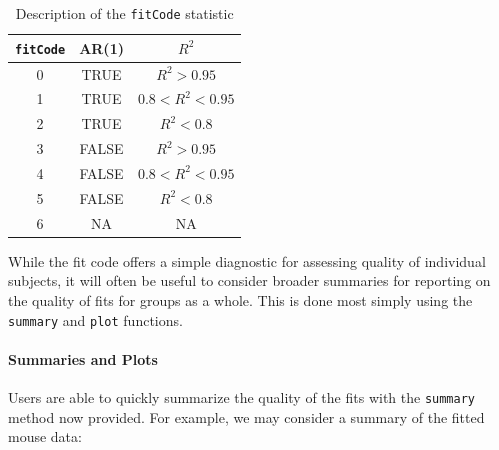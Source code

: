\documentclass{article}
\newcommand{\xt}{\texttt}%
\begin{document}
\begin{singlespace}
\begin{table}[H]
\centering
\def\arraystretch{1.5}
\begin{tabular}{|c|c|c|}
\hline
\xt{fitCode} & AR(1) & $R^2$ \\
\hline
0 & TRUE & $R^2 > 0.95$ \\
1 & TRUE & $0.8 < R^2 < 0.95$ \\
2 & TRUE & $ R^2 <0.8$ \\
3 & FALSE & $R^2 >0.95$ \\
4 & FALSE & $0.8 < R^2 < 0.95$ \\
5 & FALSE &$ R^2 <0.8$  \\
6 & NA & NA \\
\hline
\end{tabular}
\caption{Description of the \xt{fitCode} statistic}
\label{tab:fit_codes}
\end{table}
\end{singlespace}

While the fit code offers a simple diagnostic for assessing quality of individual subjects, it will often be useful to consider broader summaries for reporting on the quality of fits for groups as a whole. This is done most simply using the \xt{summary} and \xt{plot} functions. 


\paragraph{Summaries and Plots}

Users are able to quickly summarize the quality of the fits with the \xt{summary} method now provided. For example, we may consider a summary of the fitted mouse data:
\end{document}
